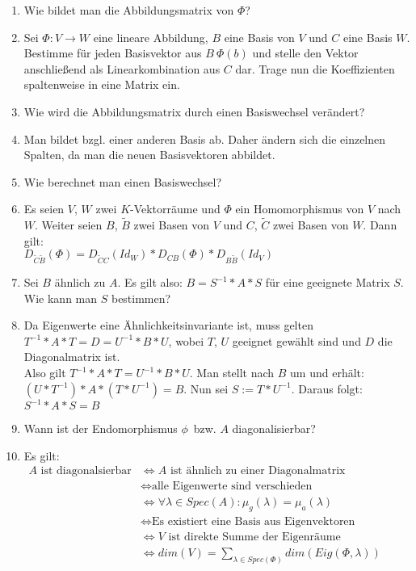 \documentclass[11pt,parskip=full]{scrartcl}
\newcommand{\answer}{\item[\textbf{Antwort}]}
\begin{document}
\begin{enumerate}[label=\textbf{\arabic*. Frage}]
		\item Wie bildet man die Abbildungsmatrix von $\Phi$?
		\answer Sei \(\Phi : V \rightarrow W\) eine lineare Abbildung, $B$ eine Basis von $V$ und $C$ eine Basis $W$. \\ 
		Bestimme für jeden Basisvektor aus $B \ \Phi(b)$ und stelle den Vektor anschließend als Linearkombination aus $C$ dar. Trage nun die Koeffizienten spaltenweise in eine Matrix ein.
				
		\item Wie wird die Abbildungsmatrix durch einen Basiswechsel verändert?
		\answer Man bildet bzgl. einer anderen Basis ab. Daher ändern sich die einzelnen Spalten, da man die neuen Basisvektoren abbildet.
		
		\item Wie berechnet man einen Basiswechsel?
		\answer Es seien $V$, $W$ zwei $K$-Vektorräume und $\Phi$ ein Homomorphismus von $V$ nach $W$. Weiter seien $B$, $\tilde{B}$ zwei Basen von $V$ und $C$, $\tilde{C}$ zwei Basen von $W$. Dann gilt:\\
		\(D_{\tilde{C}\tilde{B}}(\Phi) = D_{\tilde{C}C}(Id_W) * D_{CB}(\Phi) * D_{B\tilde{B}}(Id_V)\)
		
		\item Sei $B$ ähnlich zu $A$. Es gilt also: \(B = S^{-1} * A * S\) für eine geeignete Matrix $S$. Wie kann man $S$ bestimmen?
		\answer Da Eigenwerte eine Ähnlichkeitsinvariante ist, muss gelten \(T^{-1}*A*T = D = U^{-1}*B*U\), wobei $T$, $U$ geeignet gewählt sind und $D$ die Diagonalmatrix ist. \\
		Also gilt \(T^{-1}*A*T = U^{-1}*B*U\). Man stellt nach $B$ um und erhält: \((U*T^{-1})*A*(T*U^{-1}) = B\). Nun sei \(S := T*U^{-1}\). Daraus folgt: \\
		\(S^{-1} * A * S = B\)
		
		\item Wann ist der Endomorphismus \(\phi\)\ bzw. $A$ diagonalisierbar?
		\answer Es gilt:\\
		\(\begin{aligned}A \text{ ist diagonalsierbar} 
		&\iff A \text{ ist ähnlich zu einer Diagonalmatrix}\\
		&\iff \text{alle Eigenwerte sind verschieden}\\
		&\iff \forall \lambda \in Spec(A): \mu_{g}(\lambda) = \mu_{a}(\lambda)\\
		&\iff \text{Es existiert eine Basis aus Eigenvektoren}\\
		&\iff V \text{ ist direkte Summe der Eigenräume}\\
		&\iff dim(V) = \sum_{\lambda \in Spec(\Phi)}dim(Eig(\Phi, \lambda))
		\end{aligned}\)
		

\end{enumerate}
\end{document}
